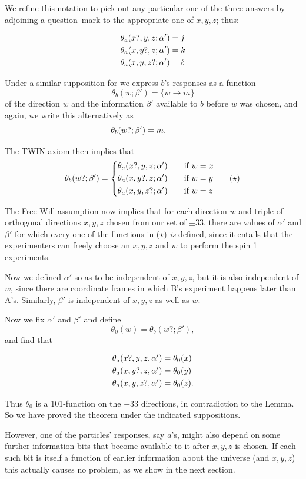 \documentclass[12pt]{amsart}
\begin{document}
We refine this notation to pick out any particular one of the
three answers by adjoining a question--mark to the appropriate
one of $x, y, z$; thus:

$$
\aligned
\theta_a(x?, y, z; \alpha' ) & =j \\
\theta_a(x, y?, z; \alpha' ) & =k\\
\theta_a(x, y, z?; \alpha' ) & =\ell\\
\endaligned
$$

Under a similar supposition for we express $b$'s responses as a function
$$
\theta_b (w ; \beta') = \{w \to m \}
$$
of the direction $w$ and the information $\beta'$ available to $b$ before $w$ was
chosen, and again, we write this alternatively as
$$
\hskip -1.25cm \theta_b (w?; \beta')=m.
$$

The TWIN axiom then implies that
$$
\theta_b (w?  ;\beta') =
\left\{
\aligned
  \theta_a (x?, y, z;\alpha')& \qquad \mbox{if } w = x\\
  \theta_a (x, y?, z;\alpha')& \qquad \mbox{if } w = y
\qquad (\star)\\
  \theta_a (x, y, z?;\alpha')& \qquad \mbox{if } w = z\\
\endaligned
\right.
$$

The Free Will assumption now implies that for each direction $w$ and triple
of orthogonal directions $x,y,z$ chosen from our set of $\pm{33}$, there are values of 
$\alpha'$ and $\beta'$ for which every one of the functions in ($\star$) {\it is} defined, since it entails that the experimenters can freely choose an $x,y,z$ 
and $w$ to perform the spin 1 experiments.

Now we defined $\alpha'$ so as to be independent of $x,y,z$, but it is also 
independent of $w$, since there are coordinate frames in which B's experiment happens later than A's.  Similarly, $\beta'$ is independent of $x,y,z$ as well as $w$.
 
Now we fix $\alpha'$ and $\beta'$ and define 
$$\theta_0(w) = \theta_b(w?;\beta'),$$
and find that

$$
\aligned
\theta_a (x?, y, z,\alpha') & = \theta_0 (x) \\
\theta_a (x, y?, z,\alpha') & = \theta_0 (y) \\
\theta_a (x, y, z?,\alpha') & = \theta_0 (z).
\endaligned
$$
 
 Thus $\theta_0$ is a 101-function on the $\pm$33 directions,
in contradiction to the Lemma.  So we have proved the theorem under the
indicated suppositions.

However, one of the particles' responses, say $a$'s, might also depend on some further information bits that become available to it after $x,y,z$ is chosen. If each such 
bit is itself a function of earlier information about the universe (and $x,y,z$)
this actually causes no problem, as we show in the next section.
 
\end{document}
